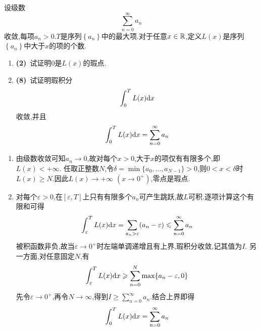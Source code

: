 \documentclass{ctexart}
\begin{document}
\begin{problem}[9.(10\songti{分})]
设级数
        \[\sum_{n=0}^{\infty}a_n\]
        收敛,每项$a_n>0$.$T$是序列$\left\{a_n\right\}$中的最大项.对于任意$x\in\mathbb{R}$,定义$L(x)$是序列$\left\{a_n\right\}$中大于$x$的项的个数.
        \begin{enumerate}[label=\tbf{(\arabic*)},topsep=0pt,parsep=0pt,itemsep=0pt,partopsep=0pt]
            \item \textbf{(2)}\ 试证明$0$是$L(x)$的瑕点.
            \item \textbf{(8)}\ 试证明瑕积分
                \[\int_0^TL(x)\mathrm{d} x\]
                收敛,并且
                \[\int_0^TL(x)\mathrm{d} x=\sum_{n=0}^{\infty}a_n\]
        \end{enumerate}
\end{problem}
\begin{solution}
\begin{enumerate}[label=\tbf{(\arabic*)},topsep=0pt,parsep=0pt,itemsep=0pt,partopsep=0pt]
\item 由级数收敛可知$a_n\to0$,故对每个$x>0$,大于$x$的项仅有有限多个,即$L(x)<+\infty$.
任取正整数$N$,令$\delta=\min\{a_0,\ldots,a_{N-1}\}>0$,则$0<x<\delta$时$L(x)\geqslant N$.因此$L(x)\to+\infty$ $(x\to0^+)$,零点是瑕点.
\item 对每个$\varepsilon>0$,在$[\varepsilon,T]$上只有有限多个$a_n$可产生跳跃,故$L$可积.逐项计算这个有限和可得
\[\int_\varepsilon^T L(x)\mathrm{d} x
=\sum_{a_n>\varepsilon}(a_n-\varepsilon)\leqslant\sum_{n=0}^{\infty}a_n\]
被积函数非负,故当$\varepsilon\to0^+$时左端单调递增且有上界,瑕积分收敛,记其值为$I$.
另一方面,对任意固定$N$,有
\[\int_\varepsilon^T L(x)\mathrm{d} x\geqslant
\sum_{n=0}^N\max\{a_n-\varepsilon,0\}\]
先令$\varepsilon\to0^+$,再令$N\to\infty$,得到$I\geqslant\sum_{n=0}^{\infty}a_n$.结合上界即得
\[\int_0^T L(x)\mathrm{d} x=\sum_{n=0}^{\infty}a_n\]
\end{enumerate}
\end{solution}
\end{document}
